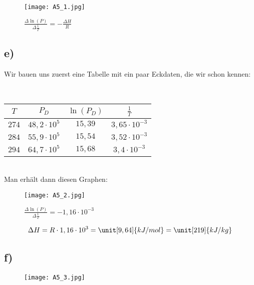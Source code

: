 \begin{figure}[h]
	\centering
	\texttt{[image: A5\_1.jpg]}
	\caption{$\frac{\Delta \ln(P)}{\Delta \frac{1}{T}} = - \frac{\Delta H}{R}$}
\end{figure}


\newpage

\subsection*{e)}

Wir bauen uns zuerst eine Tabelle mit ein paar Eckdaten, die wir schon kennen:

\hfil \\

\begin{center}
	\begin{tabular}{|c|c|c|c|}
		$T$ & $P_D$ & $\ln(P_D)$ & $\frac{1}{T}$ \\ 
		\hline
		$274$ & $48,2 \cdot 10^5$ & $15,39$ & $3,65 \cdot 10^{-3}$ \\ 
		$284$ & $55,9 \cdot 10^5$ & $15,54$ & $3,52 \cdot 10^{-3}$ \\ 
		$294$ & $64,7 \cdot 10^5$ & $15,68$ & $3,4 \cdot 10^{-3}$ \\ 
	\end{tabular} 
\end{center}

\hfil \\

Man erhält dann diesen Graphen:

\begin{figure}[h]
	\centering
	\texttt{[image: A5\_2.jpg]}
	\caption{$\frac{\Delta \ln(P)}{\Delta \frac{1}{T}} = -1,16 \cdot 10^{-3}$}
\end{figure}

\begin{align*}
\Delta H = R \cdot 1,16 \cdot 10^{3} = \unit[9,64]{kJ/mol} = \unit[219]{kJ/kg}
\end{align*}


\newpage


\subsection*{f)}

\begin{figure}[h]
	\centering
	\texttt{[image: A5\_3.jpg]}
	\caption{}
\end{figure}




